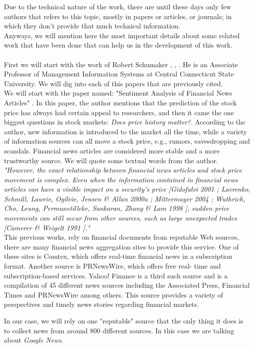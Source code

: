 Due to the technical nature of the work, there are until these days only few authors that refers to this topic, mostly in papers or articles, or journals; in which they don't provide that much technical information.\\
Anyways, we will mention here the most important details about some related work that have been done that can help us in the development of this work.\\\\
First we will start with the work of Robert Schumaker \cite{SCH2012}, \cite{SCH2010}, \cite{SCH2010-1}. He is an Associate Professor of Management Information Systems at Central Connecticut State University. We will dig into each of this papers that are previously cited.\\ We will start with the paper named: "Sentiment Analysis of Financial News Articles" \cite{SCH2012}. In this paper, the author mentions that the prediction of the stock price has always had certain appeal to researchers, and then it came the one biggest questions in stock markets:  \emph{Does price history matter?}. According to the author, new information is introduced to the market all the time, while a variety of information sources can all move a stock price, e.g., rumors, eavesdropping and scandals. Financial news articles are considered more stable and a more trustworthy source. We will quote some textual words from the author.\\

\emph{"However, the exact relationship between financial news articles and stock price movement is complex. Even when the information contained in financial news articles can have a visible impact on a security’s price [Gidofalvi 2001 \cite{GG2001}; Lavrenko, Schmill, Lawrie, Ogilvie, Jensen \& Allan 2000a \cite{LSL2001}; Mittermayer 2004 \cite{MM2004}; Wuthrich, Cho, Leung, Permunetilleke, Sankaran, Zhang \& Lam 1998 \cite{WC1998}], sudden price movements can still occur from other sources, such as large unexpected trades [Camerer \& Weigelt 1991 \cite{CW1991}]."}\\

This previous works, rely on financial documents from reputable Web sources, there are many financial news aggregation sites to provide this service. One of these sites is Comtex, which offers real-time financial news in a subscription format. Another source is PRNewsWire, which offers free real- time and subscription-based services. Yahoo! Finance is a third such source and is a compilation of 45 different news sources including the Associated Press, Financial Times and PRNewsWire among others. This source provides a variety of perspectives and timely news stories regarding financial markets.

In our case, we will rely on one "reputable" source that the only thing it does is to collect news from around 800 different sources. In this case we are talking about \emph{Google News}.
